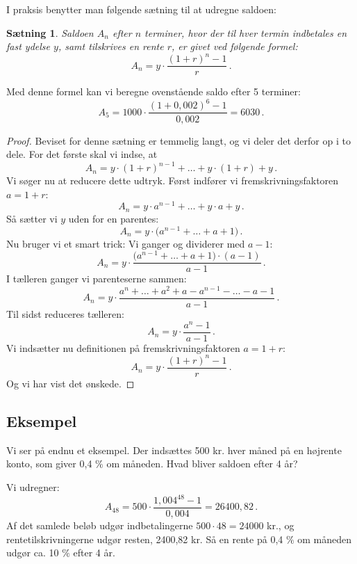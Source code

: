 \documentclass[12pt,oneside,a4paper]{article}
\newtheorem{thm}{Sætning}[section]
\begin{document}
I praksis benytter man følgende sætning til at udregne saldoen:
\begin{tcolorbox}
\begin{thm}
Saldoen $A_n$ efter $n$ terminer, hvor der til hver termin indbetales en fast ydelse $y$,
samt tilskrives en rente $r$, er givet ved følgende formel:
\[
A_n = y\cdot\frac{(1+r)^n-1}{r}\,.
\]
\end{thm}
\end{tcolorbox}

Med denne formel kan vi beregne ovenstående saldo efter 5 terminer:
\[
A_5 = 1000\cdot\frac{(1+0,002)^6-1}{0,002} = 6030 \,.
\]

\begin{tcolorbox}
\begin{proof}
Beviset for denne sætning er temmelig langt, og vi deler det derfor op i to dele. For 
det første skal vi indse, at 
\[
A_n = y\cdot(1+r)^{n-1} + \ldots + y\cdot(1+r) + y \,.
\]
Vi søger nu at reducere dette udtryk. Først indfører vi fremskrivningsfaktoren $a=1+r$:
\[
A_n = y\cdot a^{n-1} + \ldots + y\cdot a + y \,.
\]
Så sætter vi $y$ uden for en parentes:
\[
A_n = y\cdot\big(a^{n-1} + \ldots + a + 1\big) \,.
\]
Nu bruger vi et smart trick: Vi ganger og dividerer med $a-1$:
\[
A_n = y\cdot\frac{\big(a^{n-1} + \ldots + a + 1\big)\cdot(a-1)}{a-1} \,.
\]
I tælleren ganger vi parenteserne sammen:
\[
A_n = y\cdot\frac{a^{n} + \ldots + a^2 + a - a^{n-1} - \ldots - a - 1}{a-1} \,.
\]
Til sidst reduceres tælleren:
\[
A_n = y\cdot\frac{a^{n} - 1}{a-1} \,.
\]
Vi indsætter nu definitionen på fremskrivningsfaktoren $a=1+r$:
\[
A_n = y\cdot\frac{(1+r)^{n} - 1}{r} \,.
\]
Og vi har vist det ønskede.
\end{proof}
\end{tcolorbox}

\begin{tcolorbox}
\subsection{Eksempel}
Vi ser på endnu et eksempel. Der indsættes 500 kr. hver måned på en højrente konto, som giver
0,4 $\%$ om måneden. Hvad bliver saldoen efter 4 år?

Vi udregner:
\[
A_{48} = 500\cdot\frac{1,004^{48}-1}{0,004} = 26400,82 \,.
\]
Af det samlede beløb udgør indbetalingerne $500\cdot 48 = 24000$ kr., og rentetilskrivningerne
udgør resten, 2400,82 kr. Så en rente på 0,4 $\%$ om måneden udgør ca. 10 $\%$ efter 4 år.

\end{tcolorbox}
\end{document}
